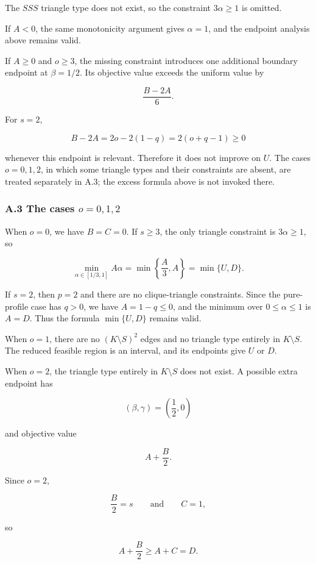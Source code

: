 \documentclass[
  american,
  11pt,
  a4paper,
]{article}
\begin{document}
The \(SSS\) triangle type does not exist, so the constraint \(3\alpha\ge1\) is omitted.

If \(A<0\), the same monotonicity argument gives \(\alpha=1\), and the endpoint analysis above remains valid.

If \(A\ge0\) and \(o\ge3\), the missing constraint introduces one additional boundary endpoint at \(\beta=1/2\). Its objective value exceeds the uniform value by

\[
\frac{B-2A}{6}.
\]

For \(s=2\),

\[
B-2A
=
2o-2(1-q)
=
2(o+q-1)\ge0
\]

whenever this endpoint is relevant. Therefore it does not improve on \(U\). The cases \(o=0,1,2\), in which some triangle types and their constraints are absent, are treated separately in A.3; the excess formula above is not invoked there.

\subsubsection{\texorpdfstring{A.3 The cases \(o=0,1,2\)}{A.3 The cases o=0,1,2}}\label{a.3-the-cases-o012}

When \(o=0\), we have \(B=C=0\). If \(s\ge3\), the only triangle constraint is \(3\alpha\ge1\), so

\[
\min_{\alpha\in[1/3,1]}A\alpha
=
\min\left\{\frac A3,A\right\}
=
\min\{U,D\}.
\]

If \(s=2\), then \(p=2\) and there are no clique-triangle constraints. Since the pure-profile case has \(q>0\), we have \(A=1-q\le0\), and the minimum over \(0\le\alpha\le1\) is \(A=D\). Thus the formula \(\min\{U,D\}\) remains valid.

When \(o=1\), there are no \((K\setminus S)^2\) edges and no triangle type entirely in \(K\setminus S\). The reduced feasible region is an interval, and its endpoints give \(U\) or \(D\).

When \(o=2\), the triangle type entirely in \(K\setminus S\) does not exist. A possible extra endpoint has

\[
(\beta,\gamma)=\left(\frac12,0\right)
\]

and objective value

\[
A+\frac B2.
\]

Since \(o=2\),

\[
\frac B2=s
\qquad\text{and}\qquad
C=1,
\]

so

\[
A+\frac B2\ge A+C=D.
\]
\end{document}
